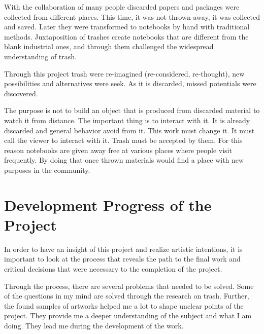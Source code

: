 With the collaboration of many people discarded papers and packages were collected from different places. This time, it was not thrown away, it was collected and saved. Later they were transformed to notebooks by hand with traditional methods. Juxtaposition of trashes create notebooks that are different from the blank industrial ones, and through them challenged the widespread understanding of trash.

Through this project trash were re-imagined (re-considered, re-thought), new possibilities and alternatives were seek. As it is discarded, missed potentials were discovered. 

The purpose is not to build an object that is produced from discarded material to watch it from distance. The important thing is to interact with it. It is already discarded and general behavior avoid from it. This work must change it. It must call the viewer to interact with it. Trash must be accepted by them. For this reason notebooks are given away free at various places where people visit frequently. By doing that once thrown materials would find a place with new purposes in the community.






%
%
\section{Development Progress of the Project}
In order to have an insight of this project and realize artistic intentions, it is important to look at the process that reveals the path to the final work and critical decisions that were necessary to the completion of the project.


Through the process, there are several problems that needed to be solved. Some of the questions in my mind are solved through the research on trash. Further, the found samples of artworks helped me a lot to shape unclear points of the project. They provide me a deeper understanding of the subject and what I am doing. They lead me during the development of the work.

